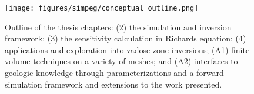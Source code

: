 \begin{figure}[!htbp]
\begin{center}
\texttt{[image: figures/simpeg/conceptual\_outline.png]}
\end{center}
\caption{
Outline of the thesis chapters: (2) the simulation and inversion framework; (3) the sensitivity calculation in Richards equation; (4) applications and exploration into vadose zone inversions; (A1) finite volume techniques on a variety of meshes; and (A2) interfaces to geologic knowledge through parameterizations and a forward simulation framework and extensions to the work presented.
}
\label{fig:simpeg-conceptual_outline}
\end{figure}
